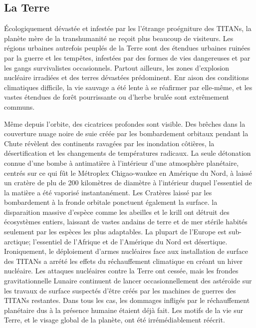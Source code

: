                                                          \subsection{La Terre} \label{sec:earth} 

                                                         Écologiquement dévastée et infestée par les l'étrange proégniture des TITANs, la planète mère de la transhumanité ne reçoit plus beaucoup de visiteurs. Les régions urbaines autrefois peuplés de la Terre sont des étendues urbaines ruinées par la guerre et les tempêtes, infestées par des formes de vies dangereuses et par les gangs survivalistes occasionnels. Partout ailleurs, les zones d'explosion nucléaire irradiées et des terres dévastées prédominent. Enr aison des conditions climatiques difficile, la vie sauvage a été lente à se réafirmer par elle-même, et les vastes étendues de forêt pourrissante ou d'herbe brulée sont extrêmement communs. 

                                                         Même depuis l'orbite, des cicatrices profondes sont visible. Des brêches dans la couverture nuage noire de suie créée par les bombardement orbitaux pendant la Chute révèlent des continents ravagées par les inondation côtières, la désertification et les changements de températures radicaux. La seule détonation connue d'une bombe à antimatière à l'intérieur d'une atmosphère planétaire, centrés sur ce qui fût le Métroplex Chigao-waukee en Amérique du Nord, à laissé un cratère de plu de 200 kilomètres de diamètre à l'intérieur duquel l'essentiel de la matière a été vaporisé instantanément. Les Cratères laissé par les bombardement à la fronde orbitale ponctuent également la surface. la disparaition massive d'espèce comme les abeilles et le krill ont détruit des écosystèmes entiers, laissant de vastes andains de terre et de mer stérile habités seulement par les espèces les plus adaptables. La plupart de l'Europe est sub-arctique; l'essentiel de l'Afrique et de l'Amérique du Nord est désertique. Ironiquement, le déploiement d'armes nucléaires face aux installation de surface des TITANs a arrété les effets du réchauffement climatique en créant un hiver nucléaire. Les attaques nucléaires contre la Terre ont cessée, mais les frondes gravitationnelle Lunaire continuent de lancer occasionnellement des astéroïde sur les travaux de surface suspectés d'être créés par les machines de guerres des TITANs restantes. Dans tous les cas, les dommages infligés par le réchauffement planétaire dus à la présence humaine étaient déjà fait. Les motifs de la vie sur Terre, et le visage global de la planète, ont été irrémédiablement réécrit. 

